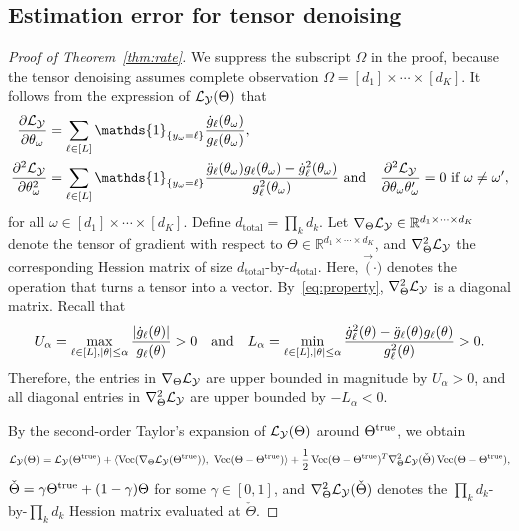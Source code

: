 \documentclass{article}
\theoremstyle{plain}
\theoremstyle{definition}
\begin{document}
\subsection{Estimation error for tensor denoising}\label{sec:proofMSE}
\begin{proof}[Proof of Theorem~\ref{thm:rate}]
We suppress the subscript $\Omega$ in the proof, because the tensor denoising assumes complete observation $\Omega=[d_1]\times \cdots \times [d_K]$. It follows from the expression of $\mathcal{L}_{\mathcal{Y}}(\Theta)$ that
\begin{align}\label{eq:property}
{\partial \flogl\over \partial \theta_\omega}&=\sum_{\ell\in[L]}\mathds{1}_{\{y_{\omega}=\ell\}}
{\dot{g}_\ell(\theta_\omega)\over g_\ell(\theta_\omega)},\notag\\
{\partial^2 \flogl\over \partial \theta_\omega^2}&=\sum_{\ell\in[L]}\mathds{1}_{\{y_\omega=\ell\}}{\ddot{g}_\ell(\theta_\omega)g_\ell(\theta_\omega)-\dot{g}^2_\ell(\theta_\omega)\over g^2_\ell(\theta_\omega)}\ \text{and}\quad
{\partial^2 \flogl\over \partial \theta_\omega \theta_\omega'}=0\ \text{if}\ \omega\neq \omega',
\end{align}
for all $\omega\in[d_1]\times \cdots \times [d_K]$.
Define $d_{\text{total}}=\prod_k d_k$. Let $\nabla_{\Theta}\mathcal{L}_{\mathcal{Y}}\in\mathbb{R}^{d_1\times\cdots\times d_K}$ denote the tensor of gradient with respect to $\Theta\in\mathbb{R}^{d_1\times \cdots\times d_K}$, and $\nabla^2_{\Theta}\mathcal{L}_{\mathcal{Y}}$ the corresponding Hession matrix of size $d_\text{total}$-by-$d_{\text{total}}$. Here, $\Vec(\cdot)$ denotes the operation that turns a tensor into a vector. By~\eqref{eq:property}, $\nabla^2_{\Theta}\mathcal{L}_{\mathcal{Y}}$ is a diagonal matrix. Recall that
\begin{equation}\label{eq:bound}
U_\alpha=\max_{\ell\in[L],|\theta|\leq \alpha}{|\dot{g}_\ell(\theta)|\over g_\ell(\theta)}>0 \quad \text{and}\quad
L_\alpha=\min_{\ell\in[L],|\theta|\leq \alpha} {\dot{g}^2_\ell(\theta)-\ddot{g}_\ell(\theta)g_\ell(\theta)\over g^2_\ell(\theta)}>0.
\end{equation}
Therefore, the entries in $\nabla_{\Theta}\mathcal{L}_{\mathcal{Y}}$ are upper bounded in magnitude by $U_\alpha>0$, and all diagonal entries in $\nabla^2_{\Theta}\mathcal{L}_{\mathcal{Y}}$ are upper bounded by $-L_{\alpha}<0$.

By the second-order Taylor's expansion of $\mathcal{L}_{\mathcal{Y}}(\Theta)$ around $\Theta^{\text{true}}$, we obtain
\begin{equation}\label{eq:taylor}
\flogl(\Theta)=\flogl(\trueT)+\langle\Vec(\fplogl(\trueT)),\ \Vec(\Theta-\trueT)\rangle+{1\over 2}\Vec(\Theta-\trueT)^T\fpplogl(\check\Theta)\Vec(\Theta-\trueT),
\end{equation}
$\check\Theta=\gamma\Theta^{\text{true}}+(1-\gamma)\Theta$ for some $\gamma\in[0,1]$, and $\nabla^2_{\Theta}\mathcal{L}_{\mathcal{Y}}(\check\Theta)$ denotes the $\prod_kd_k$-by-$\prod_k d_k$ Hession matrix evaluated at $\check\Theta$.


\end{proof}
\end{document}
